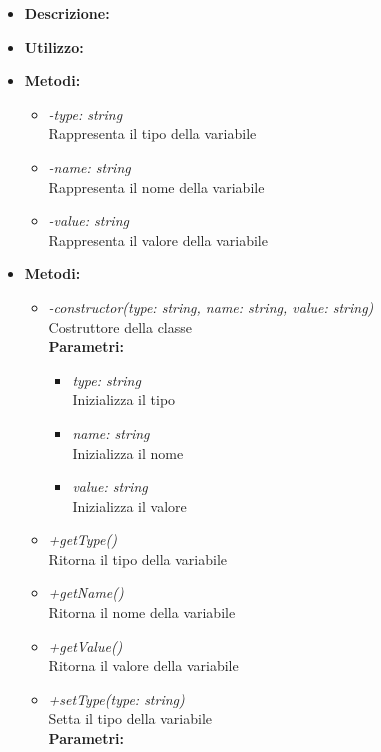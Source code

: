 \begin{itemize}
	\item \textbf{Descrizione:}\\
	
	\item \textbf{Utilizzo:}\\
	
	\item \textbf{Metodi:}
		\begin{itemize}
			\item \emph{-type: string}\\
    		Rappresenta il tipo della variabile
    		\item \emph{-name: string}\\
    		Rappresenta il nome della variabile
    		\item \emph{-value: string}\\
    		Rappresenta il valore della variabile
		\end{itemize}
	\item \textbf{Metodi:}
		\begin{itemize}
			\item \emph{-constructor(type: string, name: string, value: string)}\\
    		Costruttore della classe\\
    		\textbf{Parametri:}
    		\begin{itemize}
    			\item \emph{type: string}\\
    			Inizializza il tipo
    			\item \emph{name: string}\\
    			Inizializza il nome
    			\item \emph{value: string}\\
    			Inizializza il valore
    		\end{itemize}
    		\item \emph{+getType()}\\
    		Ritorna il tipo della variabile
    		\item \emph{+getName()}\\
    		Ritorna il nome della variabile
    		\item \emph{+getValue()}\\
    		Ritorna il valore della variabile
    		\item \emph{+setType(type: string)}\\
    		Setta il tipo della variabile\\
    		\textbf{Parametri:}

\end{itemize}
\end{itemize}
